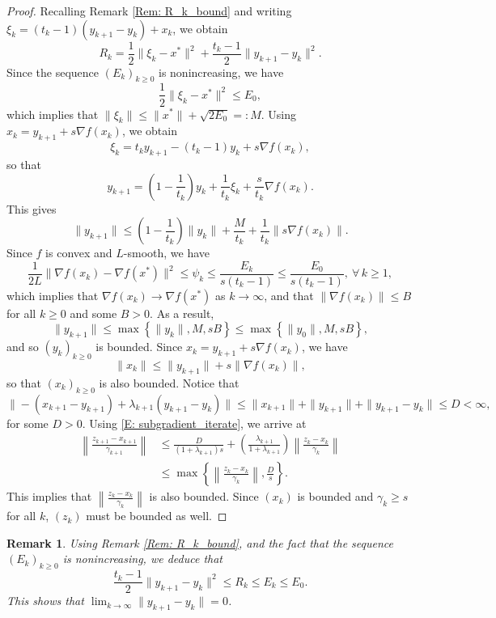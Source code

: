 \documentclass[pdflatex,sn-mathphys-num]{sn-jnl}
\theoremstyle{thmstyleone}
\theoremstyle{thmstyletwo}
\newtheorem{remark}{Remark}
\theoremstyle{thmstylethree}
\begin{document}
\begin{proof}
Recalling Remark \ref{Rem: R_k_bound} and writing $\xi_k = (t_k-1)(y_{k+1}-y_k) + x_k$, we obtain
$$ R_k = \frac{1}{2}\| \xi_k - x^* \|^2 + \frac{t_k-1}{2}\| y_{k+1}-y_k \|^2. $$
Since the sequence $(E_k)_{k\ge 0}$ is nonincreasing, we have
$$ \frac{1}{2}\| \xi_k - x^* \|^2 \le E_0, $$
which implies that $\| \xi_k \| \le \| x^* \| + \sqrt{2E_0}=: M$. Using $x_k = y_{k+1}+s\nabla f(x_k)$, we obtain
$$ \xi_k = t_k y_{k+1} - (t_k-1)y_k + s\nabla f(x_k), $$
so that
$$ y_{k+1} = \left( 1 - \frac{1}{t_k} \right) y_k + \frac{1}{t_k}\xi_k + \frac{s}{t_k}\nabla f(x_k). $$ 
This gives
$$ \| y_{k+1} \| \le \left( 1 - \frac{1}{t_k} \right)\| y_k \| + \frac{M}{t_k} + \frac{1}{t_k}\| s\nabla f(x_k) \|. $$
Since $f$ is convex and $L$-smooth, we have
\begin{equation}\label{E: gradient_f}
\frac{1}{2L}\| \nabla f(x_k) - \nabla f(x^*) \|^2 \le \psi_k \le \frac{E_k}{s(t_k-1)} \le \frac{E_0}{s(t_k-1)},\ \forall\, k\ge 1,
\end{equation}
which implies that $\nabla f(x_k)\to\nabla f(x^*)$ as $k\to\infty$, and that $\| \nabla f(x_k) \| \le B$ for all $k\ge 0$ and some $B>0$. As a result,
$$ \| y_{k+1} \| 
\le \max\left\{ \| y_k \|, M, sB \right\}
\le \max\left\{ \| y_0 \|, M, sB \right\}, $$
and so $(y_k)_{k\ge 0}$ is bounded. Since $x_k = y_{k+1} + s\nabla f(x_k)$, we have
$$ \| x_k \| \le \| y_{k+1} \| + s\| \nabla f(x_k) \|, $$
so that $(x_k)_{k\ge 0}$ is also bounded. Notice that
$$ \| -(x_{k+1}-y_{k+1}) + \lambda_{k+1} (y_{k+1}-y_k) \| \le \| x_{k+1} \| + \| y_{k+1} \| + \| y_{k+1}-y_k \| \le D<\infty,$$
for some $D>0$. Using \eqref{E: subgradient_iterate}, we arrive at
\begin{align*}
\left\| \frac{z_{k+1}-x_{k+1}}{\gamma_{k+1}} \right\| 
&\le \frac{ D }{(1 + \lambda_{k+1})s} + \left( \frac{\lambda_{k+1}}{1 + \lambda_{k+1}} \right) \left\| \frac{z_k-x_k}{\gamma_k} \right\| \\
&\le \max\left\{ \left\| \frac{z_k-x_k}{\gamma_k} \right\|, \frac{D}{s}  \right\}.
\end{align*}
This implies that $\left\| \frac{z_k-x_k}{\gamma_k} \right\|$ is also bounded. Since $(x_k)$ is bounded and $\gamma_k\ge s$ for all $k$, $(z_k)$ must be bounded as well.
\end{proof}


\begin{remark} \label{Rem: yk_regular}
Using Remark \ref{Rem: R_k_bound}, and the fact that the sequence $(E_k)_{k\ge 0}$ is nonincreasing, we deduce that
$$ \frac{t_k-1}{2}\| y_{k+1}-y_k \|^2 \le R_k \le E_k \le E_0.$$
This shows that $\lim_{k\to\infty}\|y_{k+1}-y_k\|=0$.
\end{remark}
\end{document}
